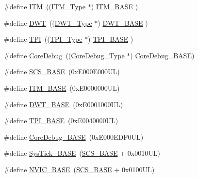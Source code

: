 \begin{DoxyCompactItemize}
\item 
\#define \hyperlink{group___c_m_s_i_s__core__base_gabae7cdf882def602cb787bb039ff6a43}{I\+TM}~((\hyperlink{struct_i_t_m___type}{I\+T\+M\+\_\+\+Type}       $\ast$)     \hyperlink{group___c_m_s_i_s__core__base_gadd76251e412a195ec0a8f47227a8359e}{I\+T\+M\+\_\+\+B\+A\+SE}      )
\item 
\#define \hyperlink{group___c_m_s_i_s__core__base_gabbe5a060185e1d5afa3f85b14e10a6ce}{D\+WT}~((\hyperlink{struct_d_w_t___type}{D\+W\+T\+\_\+\+Type}       $\ast$)     \hyperlink{group___c_m_s_i_s__core__base_gafdab534f961bf8935eb456cb7700dcd2}{D\+W\+T\+\_\+\+B\+A\+SE}      )
\item 
\#define \hyperlink{group___c_m_s_i_s__core__base_ga8b4dd00016aed25a0ea54e9a9acd1239}{T\+PI}~((\hyperlink{struct_t_p_i___type}{T\+P\+I\+\_\+\+Type}       $\ast$)     \hyperlink{group___c_m_s_i_s__core__base_ga2b1eeff850a7e418844ca847145a1a68}{T\+P\+I\+\_\+\+B\+A\+SE}      )
\item 
\#define \hyperlink{group___c_m_s_i_s__core__base_gab6e30a2b802d9021619dbb0be7f5d63d}{Core\+Debug}~((\hyperlink{struct_core_debug___type}{Core\+Debug\+\_\+\+Type} $\ast$)     \hyperlink{group___c_m_s_i_s__core__base_ga680604dbcda9e9b31a1639fcffe5230b}{Core\+Debug\+\_\+\+B\+A\+SE})
\item 
\#define \hyperlink{group___c_m_s_i_s__core__base_ga3c14ed93192c8d9143322bbf77ebf770}{S\+C\+S\+\_\+\+B\+A\+SE}~(0x\+E000\+E000\+U\+L)
\item 
\#define \hyperlink{group___c_m_s_i_s__core__base_gadd76251e412a195ec0a8f47227a8359e}{I\+T\+M\+\_\+\+B\+A\+SE}~(0x\+E0000000\+U\+L)
\item 
\#define \hyperlink{group___c_m_s_i_s__core__base_gafdab534f961bf8935eb456cb7700dcd2}{D\+W\+T\+\_\+\+B\+A\+SE}~(0x\+E0001000\+U\+L)
\item 
\#define \hyperlink{group___c_m_s_i_s__core__base_ga2b1eeff850a7e418844ca847145a1a68}{T\+P\+I\+\_\+\+B\+A\+SE}~(0x\+E0040000\+U\+L)
\item 
\#define \hyperlink{group___c_m_s_i_s__core__base_ga680604dbcda9e9b31a1639fcffe5230b}{Core\+Debug\+\_\+\+B\+A\+SE}~(0x\+E000\+E\+D\+F0\+U\+L)
\item 
\#define \hyperlink{group___c_m_s_i_s__core__base_ga58effaac0b93006b756d33209e814646}{Sys\+Tick\+\_\+\+B\+A\+SE}~(\hyperlink{group___c_m_s_i_s__core__base_ga3c14ed93192c8d9143322bbf77ebf770}{S\+C\+S\+\_\+\+B\+A\+SE} +  0x0010\+U\+L)
\item 
\#define \hyperlink{group___c_m_s_i_s__core__base_gaa0288691785a5f868238e0468b39523d}{N\+V\+I\+C\+\_\+\+B\+A\+SE}~(\hyperlink{group___c_m_s_i_s__core__base_ga3c14ed93192c8d9143322bbf77ebf770}{S\+C\+S\+\_\+\+B\+A\+SE} +  0x0100\+U\+L)

\end{DoxyCompactItemize}
